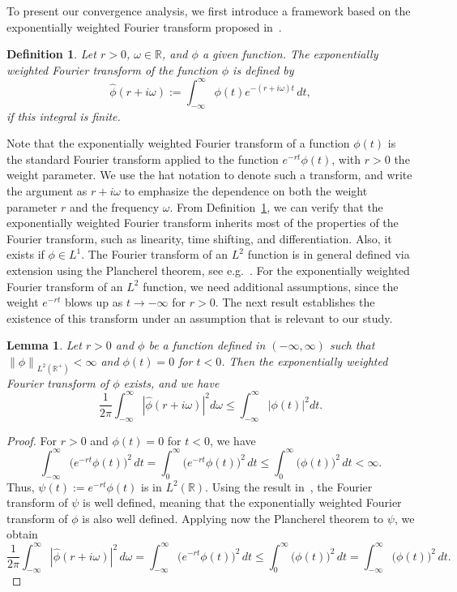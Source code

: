 \documentclass[10pt,a4paper]{amsart}
\newtheorem{lemma}{Lemma}
\newtheorem{definition}{Definition}
\newcommand{\norm}[1]{\left\lVert#1\right\rVert}
\begin{document}
To present our convergence analysis, we first introduce a framework based on the exponentially weighted Fourier transform proposed in~\cite{Kwok2025}.


\begin{definition}\label{def:FourierTransform}
Let $r>0$, $\omega\in\mathbb{R}$, and $\phi$ a given function. The exponentially weighted Fourier transform of the function $\phi$ is defined by
\[\hat{\phi}(r + i\omega) :=  \int_{-\infty}^{\infty} \phi(t) e^{-(r+i \omega) t} \, dt,\] 
if this integral is finite.
\end{definition}
Note that the exponentially weighted Fourier transform of a function $\phi(t)$ is the standard Fourier transform applied to the function $e^{-rt}\phi(t)$, with $r>0$ the weight parameter. We use the hat notation to denote such a transform, and write the argument as $r+i\omega$ to emphasize the dependence on both the weight parameter $r$ and the frequency $\omega$. From Definition~\ref{def:FourierTransform}, we can verify that the exponentially weighted Fourier transform inherits most of the properties of the Fourier transform, such as linearity, time shifting, and differentiation. Also, it exists if $\phi\in L^1$. 
The Fourier transform of an $L^2$ function is in general defined via extension using the Plancherel theorem, see e.g.~\cite{grafakos2014a}. For the exponentially weighted Fourier transform of an $L^2$ function, we need additional assumptions, since the weight $e^{-rt}$ blows up as $t\to-\infty$ for $r>0$. The next result establishes the existence of this transform under an assumption that is relevant to our study.


\begin{lemma}\label{prepCont2norm}
Let $r > 0$ and $\phi$ be a function defined in $(-\infty,\infty)$ such that $\norm{\phi}_{L^2(\mathbb{R^+})} < \infty$ and $\phi(t) = 0$ for $t < 0$. Then the exponentially weighted Fourier transform of $\phi$ exists, and we have
\[\frac{1}{2 \pi} \int_{-\infty}^{\infty} |\hat{\phi}(r+i\omega)|^2 d\omega \leq \int_{-\infty}^{\infty} |\phi(t)|^2 dt.\]
\end{lemma}

\begin{proof}
For $r > 0$ and $\phi(t) = 0$ for $t < 0$, we have
\[\int_{-\infty}^{\infty} \big(e^{-rt} \phi(t)\big)^2 \, dt =  \int_{0}^{\infty} \big(e^{-rt}\phi(t)\big)^2 \, dt \leq \int_{0}^{\infty} \big(\phi(t)\big)^2 \, dt < \infty.\]
Thus, $\psi(t) := e^{-r t} \phi(t)$ is in $L^2(\mathbb{R})$. Using the result in~\cite{grafakos2014a}, the Fourier transform of $\psi$ is well defined, meaning that the exponentially weighted Fourier transform of $\phi$ is also well defined. 
Applying now the Plancherel theorem to $\psi$, we obtain 
\[\frac{1}{2 \pi} \int_{-\infty}^{\infty} |\hat{\phi}(r+i\omega)|^2 \, d\omega = \int_{-\infty}^{\infty} \big(e^{-rt} \phi(t)\big)^2 \, dt \leq \int_{0}^{\infty} \big(\phi(t)\big)^2 \, dt = \int_{-\infty}^{\infty} \big(\phi(t)\big)^2 \, dt.\]
\end{proof}
\end{document}
